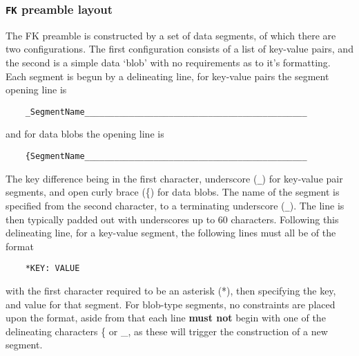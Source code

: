 \documentclass[11pt]{article}
\begin{document}
\subsubsection*{{\tt FK} preamble layout}
The FK preamble is constructed by a set of data segments, of which there are two
configurations. The first configuration consists of a list of key-value pairs,
and the second is a simple data `blob' with no requirements as to it's
formatting. Each segment is begun by a delineating line, for key-value pairs the
segment opening line is
\begin{verbatim}
    _SegmentName_____________________________________________
\end{verbatim}
and for data blobs the opening line is
\begin{verbatim}
    {SegmentName_____________________________________________
\end{verbatim}
The key difference being in the first character, underscore ({\tt \_}) for
key-value pair segments, and open curly brace (\{) for data blobs. The name of
the segment is specified from the second character, to a terminating
underscore ({\tt \_}). The line is then typically padded out with underscores up
to 60 characters. Following this delineating line, for a key-value segment, the
following lines must all be of the format
\begin{verbatim}
    *KEY: VALUE
\end{verbatim}
with the first character required to be an asterisk (*), then specifying the
key, and value for that segment. For blob-type segments, no constraints are
placed upon the format, aside from that each line \textbf{must not} begin with
one of the delineating characters \{ or \_, as these will trigger the
construction of a new segment.
\end{document}

